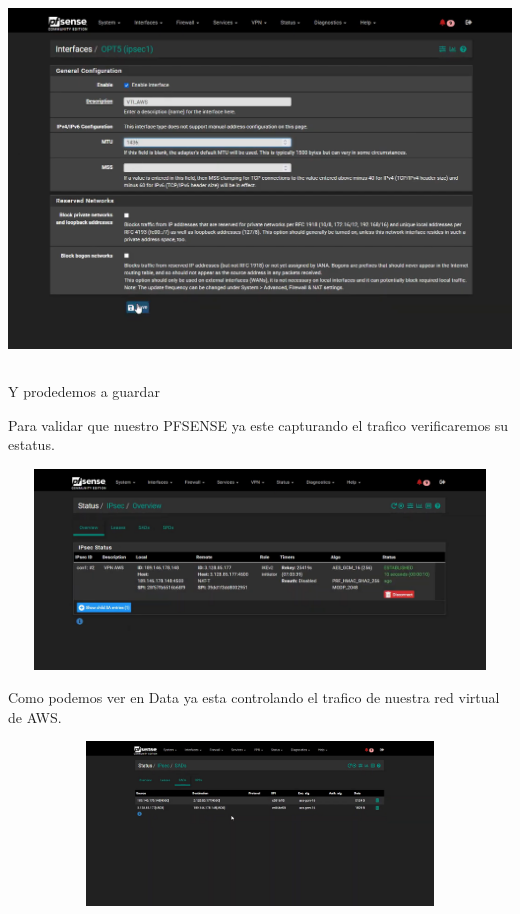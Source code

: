 \documentclass{article} %
\begin{document}
\noindent \includegraphics*[width=6.75in, height=3.85in, trim=0.15in 0.46in 0.17in 0.41in]{image32}

\noindent 

\noindent Y prodedemos a guardar 

\noindent 

\noindent Para validar que nuestro PFSENSE ya este capturando el trafico verificaremos su estatus.  

\noindent 

\noindent 

\noindent \includegraphics*[width=6.22in, height=2.09in, trim=0.42in 0.56in 0.09in 0.33in]{image33}

\noindent 

\noindent Como podemos ver en Data ya esta controlando el trafico de nuestra red virtual de AWS.

\noindent 

\noindent 

\noindent \includegraphics*[width=6.14in, height=1.71in, trim=1.04in 1.78in 1.11in 0.38in]{image34}
\end{document}
